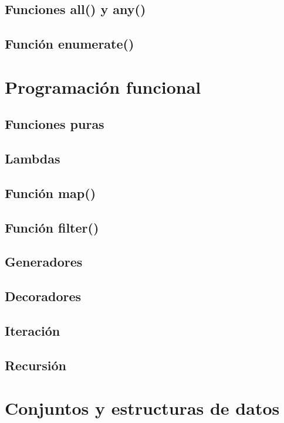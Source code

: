 \documentclass{article}
\begin{document}
\subsection{Funciones all() y any()}

\subsection{Función enumerate()}

\section{Programación funcional}

\subsection{Funciones puras}

\subsection{Lambdas}

\subsection{Función map()}

\subsection{Función filter()}

\subsection{Generadores}

\subsection{Decoradores}

\subsection{Iteración}

\subsection{Recursión}

\section{Conjuntos y estructuras de datos}
\end{document}
